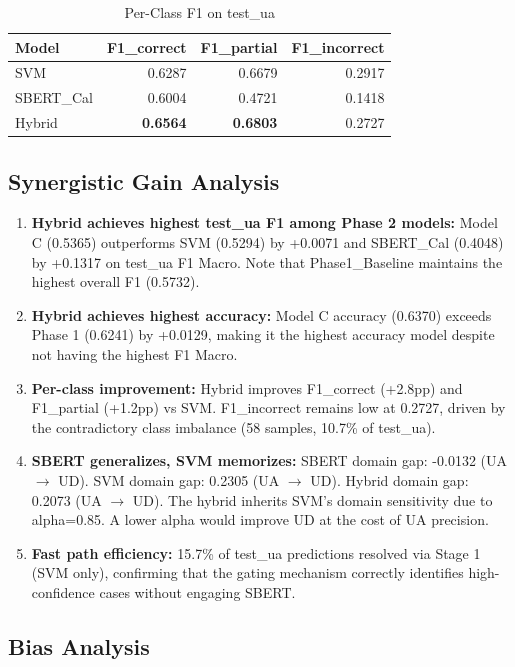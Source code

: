 \documentclass[conference]{IEEEtran}
\begin{document}
\begin{table}[ht]
\centering
\caption{Per-Class F1 on test\_ua}
\begin{tabular}{lrrr}
\toprule
\textbf{Model} & \textbf{F1\_correct} & \textbf{F1\_partial} & \textbf{F1\_incorrect} \\
\midrule
SVM & 0.6287 & 0.6679 & 0.2917 \\
SBERT\_Cal & 0.6004 & 0.4721 & 0.1418 \\
Hybrid & \textbf{0.6564} & \textbf{0.6803} & 0.2727 \\
\bottomrule
\end{tabular}
\end{table}

\subsection{Synergistic Gain Analysis}
\begin{enumerate}
    \item \textbf{Hybrid achieves highest test\_ua F1 among Phase 2 models:} Model C (0.5365) outperforms SVM (0.5294) by +0.0071 and SBERT\_Cal (0.4048) by +0.1317 on test\_ua F1 Macro. Note that Phase1\_Baseline maintains the highest overall F1 (0.5732).
    \item \textbf{Hybrid achieves highest accuracy:} Model C accuracy (0.6370) exceeds Phase 1 (0.6241) by +0.0129, making it the highest accuracy model despite not having the highest F1 Macro.
    \item \textbf{Per-class improvement:} Hybrid improves F1\_correct (+2.8pp) and F1\_partial (+1.2pp) vs SVM. F1\_incorrect remains low at 0.2727, driven by the contradictory class imbalance (58 samples, 10.7\% of test\_ua).
    \item \textbf{SBERT generalizes, SVM memorizes:} SBERT domain gap: -0.0132 (UA $\to$ UD). SVM domain gap: 0.2305 (UA $\to$ UD). Hybrid domain gap: 0.2073 (UA $\to$ UD). The hybrid inherits SVM's domain sensitivity due to alpha=0.85. A lower alpha would improve UD at the cost of UA precision.
    \item \textbf{Fast path efficiency:} 15.7\% of test\_ua predictions resolved via Stage 1 (SVM only), confirming that the gating mechanism correctly identifies high-confidence cases without engaging SBERT.
\end{enumerate}

\subsection{Bias Analysis}
\end{document}
